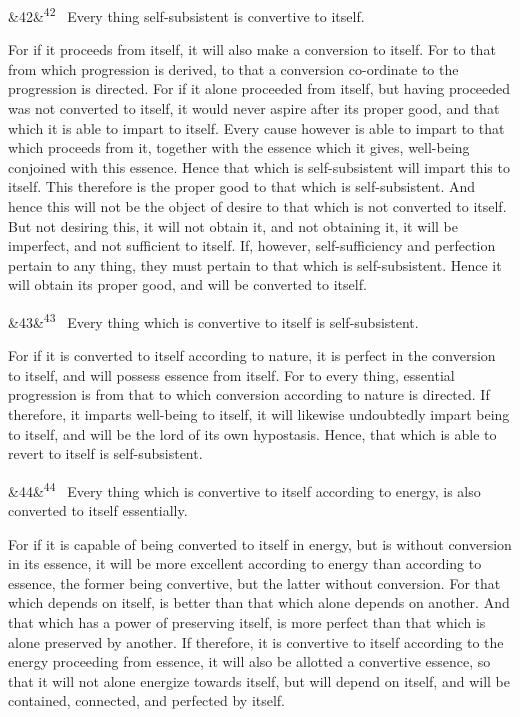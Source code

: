 \documentclass[12pt]{article}
\newcommand{\para}[1][]{\par\noindent\ifx&#1&\else\textsuperscript{\footnotesize #1}~\fi}
\begin{document}
\para[42] Every thing self-subsistent is convertive to itself.

For if it proceeds from itself, it will also make a conversion to itself. For to that from which progression is derived, to that a conversion co-ordinate to the progression is directed. For if it alone proceeded from itself, but having proceeded was not converted to itself, it would never aspire after its proper good, and that which it is able to impart to itself. Every cause however is able to impart to that which proceeds from it, together with the essence which it gives, well-being conjoined with this essence. Hence that which is self-subsistent will impart this to itself. This therefore is the proper good to that which is self-subsistent. And hence this will not be the object of desire to that which is not converted to itself. But not desiring this, it will not obtain it, and not obtaining it, it will be imperfect, and not sufficient to itself. If, however, self-sufficiency and perfection pertain to any thing, they must pertain to that which is self-subsistent. Hence it will obtain its proper good, and will be converted to itself.

\para[43] Every thing which is convertive to itself is self-subsistent.

For if it is converted to itself according to nature, it is perfect in the conversion to itself, and will possess essence from itself. For to every thing, essential progression is from that to which conversion according to nature is directed. If therefore, it imparts well-being to itself, it will likewise undoubtedly impart being to itself, and will be the lord of its own hypostasis. Hence, that which is able to revert to itself is self-subsistent.

\para[44] Every thing which is convertive to itself according to energy, is also converted to itself essentially.

For if it is capable of being converted to itself in energy, but is without conversion in its essence, it will be more excellent according to energy than according to essence, the former being convertive, but the latter without conversion. For that which depends on itself, is better than that which alone depends on another. And that which has a power of preserving itself, is more perfect than that which is alone preserved by another. If therefore, it is convertive to itself according to the energy proceeding from essence, it will also be allotted a convertive essence, so that it will not alone energize towards itself, but will depend on itself, and will be contained, connected, and perfected by itself.
\end{document}

